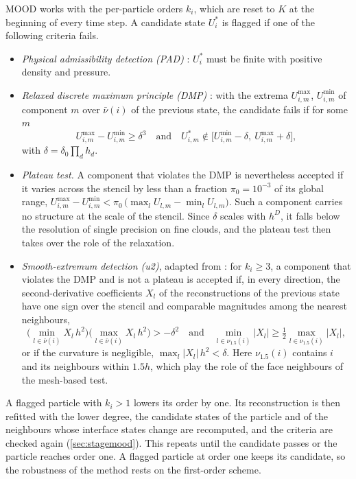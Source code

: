 \documentclass[smallextended]{svjour3}
\numberwithin{equation}{section}
\newcommand{\nb}{\nu}
\newcommand{\cnb}{\bar\nu}
\begin{document}
MOOD works with the per-particle orders $k_i$, which are reset to $K$ at the beginning of every time step. A candidate state $U^*_i$ is flagged if one of the following criteria fails.
\begin{itemize}
\item \emph{Physical admissibility detection (PAD)} \cite{Diot2012,Diot2013}: $U^*_i$ must be finite with positive density and pressure.
\item \emph{Relaxed discrete maximum principle (DMP)} \cite{Clain2011,Diot2013,Dumbser2014}: with the extrema $U^{\max}_{i,m}$, $U^{\min}_{i,m}$ of component $m$ over $\cnb(i)$ of the previous state, the candidate fails if for some $m$
\begin{equation}\label{eq:dmp}
U^{\max}_{i,m}-U^{\min}_{i,m}\ge\delta^3\quad\text{and}\quad U^*_{i,m}\notin\big[U^{\min}_{i,m}-\delta,\ U^{\max}_{i,m}+\delta\big],
\end{equation}
with $\delta=\delta_0\prod_dh_d$.
\item \emph{Plateau test.} A component that violates the DMP is nevertheless accepted if it varies across the stencil by less than a fraction $\pi_0=10^{-3}$ of its global range, $U^{\max}_{i,m}-U^{\min}_{i,m}<\pi_0\,\big(\max_lU_{l,m}-\min_lU_{l,m}\big)$. Such a component carries no structure at the scale of the stencil. Since $\delta$ scales with $h^D$, it falls below the resolution of single precision on fine clouds, and the plateau test then takes over the role of the relaxation.
\item \emph{Smooth-extremum detection (u2)}, adapted from \cite{Diot2012,Diot2013}: for $k_i\ge3$, a component that violates the DMP and is not a plateau is accepted if, in every direction, the second-derivative coefficients $X_l$ of the reconstructions of the previous state have one sign over the stencil and comparable magnitudes among the nearest neighbours,
\begin{equation}\label{eq:u2}
\big(\min_{l\in\cnb(i)}X_l\,h^2\big)\big(\max_{l\in\cnb(i)}X_l\,h^2\big)>-\delta^2\quad\text{and}\quad\min_{l\in\nb_{1.5}(i)}|X_l|\ge\tfrac12\max_{l\in\nb_{1.5}(i)}|X_l|,
\end{equation}
or if the curvature is negligible, $\max_l|X_l|\,h^2<\delta$. Here $\nb_{1.5}(i)$ contains $i$ and its neighbours within $1.5h$, which play the role of the face neighbours of the mesh-based test.
\end{itemize}
A flagged particle with $k_i>1$ lowers its order by one. Its reconstruction is then refitted with the lower degree, the candidate states of the particle and of the neighbours whose interface states change are recomputed, and the criteria are checked again (\cref{sec:stagemood}). This repeats until the candidate passes or the particle reaches order one. A flagged particle at order one keeps its candidate, so the robustness of the method rests on the first-order scheme.
\end{document}
